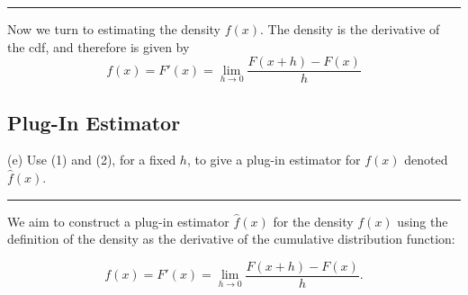 \documentclass{article}
\newenvironment{colorparagraph}[1]{\par\color{#1}}{\par}
\begin{document}

      
        
      

\rule{\textwidth}{0.5pt}

\begin{colorparagraph}{questioncolor}
Now we turn to estimating the density \( f(x) \). The density is the derivative of the cdf, and therefore is given by
\[
f(x) = F'(x) = \lim_{h \to 0} \frac{F(x + h) - F(x)}{h}
\]
\end{colorparagraph}

\begin{colorparagraph}{questioncolor}
\label{q2e}
\subsection{Plug-In Estimator}
(e) Use (1) and (2), for a fixed \( h \), to give a plug-in estimator for \( f(x) \) denoted \( \hat{f}(x) \).

\rule{\textwidth}{0.5pt}
\end{colorparagraph}

We aim to construct a plug-in estimator \( \hat{f}(x) \) for the density \( f(x) \) using the definition of the density as the derivative of the cumulative distribution function:

\[
f(x) = F'(x) = \lim_{h \to 0} \frac{F(x + h) - F(x)}{h}.
\]
\end{document}
